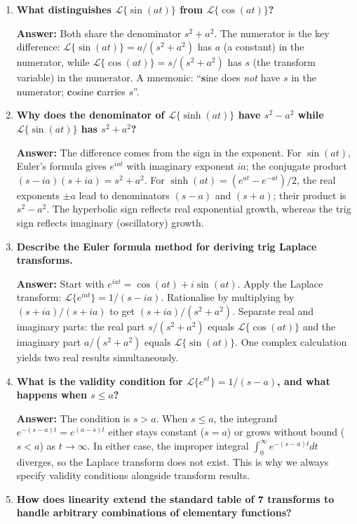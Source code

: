 \documentclass[12pt,a4paper]{article}
\begin{document}
\begin{enumerate}[leftmargin=*, label=\textbf{Q\arabic*.}]
\item \textbf{What distinguishes $\mathcal{L}\{\sin(at)\}$ from $\mathcal{L}\{\cos(at)\}$?}

\textbf{Answer:} Both share the denominator $s^2 + a^2$. The numerator is the key
difference: $\mathcal{L}\{\sin(at)\} = a/(s^2+a^2)$ has $a$ (a constant) in the
numerator, while $\mathcal{L}\{\cos(at)\} = s/(s^2+a^2)$ has $s$ (the transform
variable) in the numerator. A mnemonic: ``$\mathbf{s}$ine does \emph{not} have $s$
in the numerator; $\mathbf{c}$osine $\mathbf{c}$arries $s$''.

\item \textbf{Why does the denominator of $\mathcal{L}\{\sinh(at)\}$ have $s^2 - a^2$ while
$\mathcal{L}\{\sin(at)\}$ has $s^2 + a^2$?}

\textbf{Answer:} The difference comes from the sign in the exponent. For $\sin(at)$,
Euler's formula gives $e^{iat}$ with imaginary exponent $ia$; the conjugate product
$(s - ia)(s + ia) = s^2 + a^2$. For $\sinh(at) = (e^{at} - e^{-at})/2$, the real
exponents $\pm a$ lead to denominators $(s-a)$ and $(s+a)$; their product is
$s^2 - a^2$. The hyperbolic sign reflects real exponential growth, whereas the trig
sign reflects imaginary (oscillatory) growth.

\item \textbf{Describe the Euler formula method for deriving trig Laplace transforms.}

\textbf{Answer:} Start with $e^{iat} = \cos(at) + i\sin(at)$. Apply the Laplace
transform: $\mathcal{L}\{e^{iat}\} = 1/(s - ia)$. Rationalise by multiplying by
$(s + ia)/(s + ia)$ to get $(s + ia)/(s^2 + a^2)$. Separate real and imaginary
parts: the real part $s/(s^2+a^2)$ equals $\mathcal{L}\{\cos(at)\}$ and the imaginary
part $a/(s^2+a^2)$ equals $\mathcal{L}\{\sin(at)\}$. One complex calculation yields
two real results simultaneously.

\item \textbf{What is the validity condition for $\mathcal{L}\{e^{at}\} = 1/(s-a)$,
and what happens when $s \leq a$?}

\textbf{Answer:} The condition is $s > a$. When $s \leq a$, the integrand
$e^{-(s-a)t} = e^{(a-s)t}$ either stays constant ($s = a$) or grows without bound
($s < a$) as $t \to \infty$. In either case, the improper integral
$\int_0^\infty e^{-(s-a)t} dt$ diverges, so the Laplace transform does not exist.
This is why we always specify validity conditions alongside transform results.

\item \textbf{How does linearity extend the standard table of 7 transforms to handle
arbitrary combinations of elementary functions?}


\end{enumerate}
\end{document}
